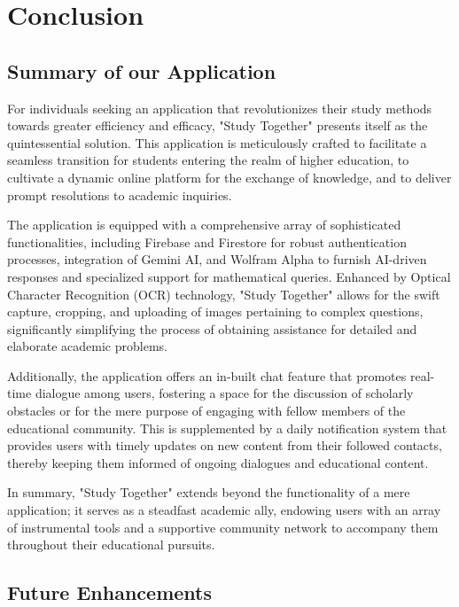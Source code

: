 
\chapter{Conclusion}\label{ch:Conclusion}

\section{Summary of our Application}\label{summary_app}
For individuals seeking an application that revolutionizes their study methods towards greater efficiency and efficacy, "Study Together" presents itself as the quintessential solution. This application is meticulously crafted to facilitate a seamless transition for students entering the realm of higher education, to cultivate a dynamic online platform for the exchange of knowledge, and to deliver prompt resolutions to academic inquiries.

The application is equipped with a comprehensive array of sophisticated functionalities, including Firebase and Firestore for robust authentication processes, integration of Gemini AI, and Wolfram Alpha to furnish AI-driven responses and specialized support for mathematical queries. Enhanced by Optical Character Recognition (OCR) technology, "Study Together" allows for the swift capture, cropping, and uploading of images pertaining to complex questions, significantly simplifying the process of obtaining assistance for detailed and elaborate academic problems.

Additionally, the application offers an in-built chat feature that promotes real-time dialogue among users, fostering a space for the discussion of scholarly obstacles or for the mere purpose of engaging with fellow members of the educational community. This is supplemented by a daily notification system that provides users with timely updates on new content from their followed contacts, thereby keeping them informed of ongoing dialogues and educational content.

In summary, "Study Together" extends beyond the functionality of a mere application; it serves as a steadfast academic ally, endowing users with an array of instrumental tools and a supportive community network to accompany them throughout their educational pursuits.


\section{Future Enhancements}\label{future_enhancements}

